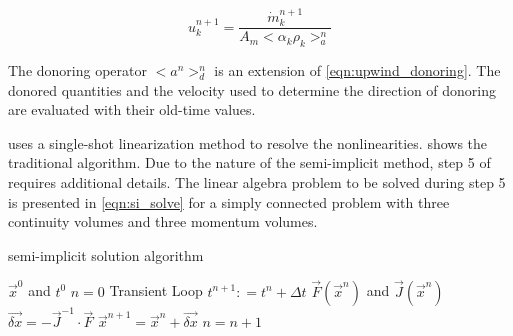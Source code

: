 \begin{equation}
\label{eqn:si_vel}
u^{n+1}_k = \frac{\dot{m}^{n+1}_k}{A_m <\alpha_k \rho_k>^{n}_{a}} 
\end{equation}

The donoring operator $<a^n>^{n}_{d}$ is an extension of \eqref{eqn:upwind_donoring}.
The donored quantities and the velocity used to determine the direction of donoring are evaluated with their old-time values.

\cobra{} uses a single-shot linearization method to resolve the nonlinearities.
 shows the traditional algorithm.
Due to the nature of the semi-implicit method, step 5 of  requires additional details.
The linear algebra problem to be solved during step 5 is presented in \eqref{eqn:si_solve} for a simply connected problem with three continuity volumes and three momentum volumes.

\begin{algo}[H]
\caption{\cobra{} semi-implicit solution algorithm}
\label{alg:si_legacy}
\setlength{\baselineskip}{0.625\baselineskip}
\begin{algorithmic}[1]
\Require $\vec{x}^{0}$ and $t^{0}$
\Set $n = 0$
\Loop \; Transient Loop
    \State $t^{n+1} : = t^{n} + \Delta t$
	\Calculate $\vec{F}(\vec{x}^{n})$ and $\vec{J}(\vec{x}^{n})$
	\BlackBox $\vec{\delta x} = - \vec{J}^{-1}\cdot\vec{F}$
	\Calculate $\vec{x}^{n+1} = \vec{x}^{n} + \vec{\delta x}$
	\State $n = n + 1$
\EndLoop
\end{algorithmic}
\end{algo}


